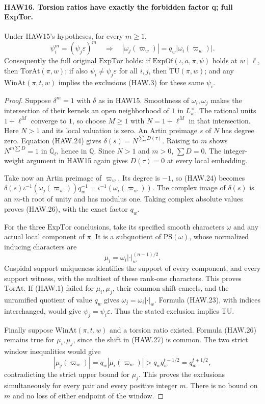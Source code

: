 \documentclass[11pt,a4paper]{article}
\numberwithin{equation}{section}
\theoremstyle{remark}\newtheorem{remark}[theorem]{Remark}
\begin{document}
\paragraph{HAW16. Torsion ratios have exactly the forbidden factor q; full ExpTor.}
\label{claim:HAW16}
Under HAW15's hypotheses, for every $m\ge1$,
\[
 \psi_i^m=(\psi_j\varepsilon)^m
       \quad\Longrightarrow\quad
                   |\omega_j(\varpi_w)|=q_w|\omega_i(\varpi_w)|.
 \tag{HAW.26}
\]
Consequently the full original $\mathrm{ExpTor}$ holds:
if $\mathrm{ExpOf}(\iota,a,\pi,\psi)$ holds at $w\mid\ell$,
then $\mathrm{TorAt}(\pi,w)$; if also
$\psi_i\ne\psi_j\varepsilon$ for all $i,j$, then
$\mathrm{TU}(\pi,w)$; and any $\mathrm{WinAt}(\pi,t,w)$
implies the exclusions (HAW.3) for these same $\psi_i$.
\begin{proof}
Suppose $\delta^m=1$ with $\delta$ as in HAW15.
Smoothness of $\omega_i,\omega_j$ makes the intersection
of their kernels an open neighborhood of $1$ in
$L_w^\times$.  The rational units $1+\ell^M$ converge to
$1$, so choose $M\ge1$ with $N=1+\ell^M$ in that
intersection.  Here $N>1$ and its local valuation is zero.
An Artin preimage $s$ of $N$ has degree zero.
Equation (HAW.24) gives $\delta(s)=N^{\sum_\tau D(\tau)}$.
Raising to $m$ shows $N^{m\sum D}=1$ in
$\overline{\mathbb Q}_\ell$, hence in $\mathbb Q$.
Since $N>1$ and $m>0$, $\sum D=0$.  The integer-weight
argument in HAW15 again gives $D(\tau)=0$ at every local
embedding.

Take now an Artin preimage of $\varpi_w$.  Its degree is
$-1$, so (HAW.24) becomes
$\delta(s)\iota^{-1}(\omega_j(\varpi_w))q_w^{-1}
=\iota^{-1}(\omega_i(\varpi_w))$.
The complex image of $\delta(s)$ is an $m$-th root of unity
and has modulus one.  Taking complex absolute values proves
(HAW.26), with the exact factor $q_w$.

For the three $\mathrm{ExpTor}$ conclusions, take its
specified smooth characters $\omega$ and any actual local
component of $\pi$.  It is a subquotient of
$\mathrm{PS}(\omega)$, whose normalized inducing characters
are
\[
             \mu_i=\omega_i|\cdot|_w^{(n-1)/2}.
 \tag{HAW.27}
\]
Cuspidal support uniqueness identifies the support of every
component, and every support witness, with the multiset of
these rank-one characters.  This proves $\mathrm{TorAt}$.
If (HAW.1) failed for $\mu_i,\mu_j$, their common shift
cancels, and the unramified quotient of value $q_w$ gives
$\omega_j=\omega_i|\cdot|_w$.  Formula (HAW.23), with
indices interchanged, would give
$\psi_j=\psi_i\varepsilon$.  Thus the stated exclusion
implies $\mathrm{TU}$.

Finally suppose $\mathrm{WinAt}(\pi,t,w)$ and a torsion
ratio existed.  Formula (HAW.26) remains true for $\mu_i,
\mu_j$, since the shift in (HAW.27) is common.  The two
strict window inequalities would give
\[
 |\mu_j(\varpi_w)|=q_w|\mu_i(\varpi_w)|
       >q_wq_w^{t-1/2}=q_w^{t+1/2},
\]
contradicting the strict upper bound for $\mu_j$.
This proves the exclusions simultaneously for every pair
and every positive integer $m$.  There is no bound on $m$
and no loss of either endpoint of the window.
\end{proof}
\end{document}
